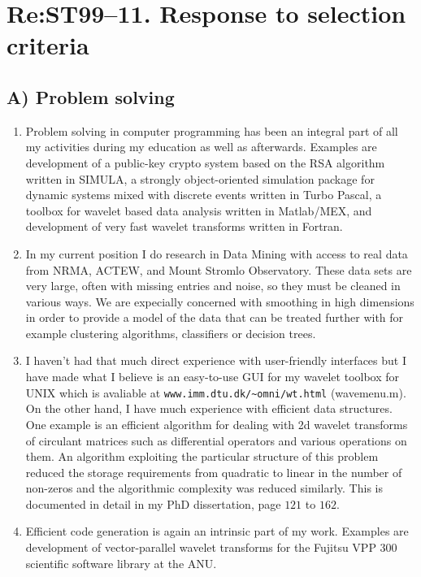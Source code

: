 \documentclass[12pt,a4paper]{article}
\begin{document}
\section*{Re:ST99--11. Response to selection criteria}

\subsection*{A) Problem solving}
\begin{enumerate} 
  \item Problem solving in computer programming has been an integral part
  of all my activities during my education as well as afterwards.
  Examples are development of a public-key crypto system based on the 
  RSA algorithm written in SIMULA, 
  a strongly object-oriented simulation package for 
  dynamic systems mixed with discrete events written in Turbo Pascal,
  a toolbox for wavelet based data analysis written in Matlab/MEX, 
  and development of very fast wavelet transforms written in Fortran.
  \item In my current position I do research in Data Mining with access
  to real data from NRMA, ACTEW, and Mount Stromlo Observatory.
  These data sets are very large, often with missing entries and noise,
  so they must be cleaned in various ways. We are expecially concerned
  with smoothing in high dimensions in order to provide a model of the 
  data that can be treated further with for example 
  clustering algorithms, classifiers or decision trees.
  \item I haven't had that much direct experience with 
  user-friendly interfaces but I have made what I believe is an easy-to-use
  GUI for my wavelet toolbox for UNIX which is avaliable at 
  {\tt www.imm.dtu.dk/\~{}omni/wt.html} (wavemenu.m).
  On the other hand, I have much experience with efficient data structures.
  One example is an efficient algorithm for dealing with 2d wavelet transforms
  of circulant matrices such as differential operators 
  and various operations on them.
  An algorithm exploiting the particular structure of this problem 
  reduced the storage requirements from quadratic to linear in the 
  number of non-zeros and the algorithmic complexity was reduced similarly.
  This is documented in detail in my PhD dissertation, page $121$ to $162$.   
  \item Efficient code generation is again an intrinsic part of my work.
  Examples are development of vector-parallel wavelet transforms
  for the Fujitsu VPP 300 scientific software library at the ANU.

\end{enumerate}
\end{document}
